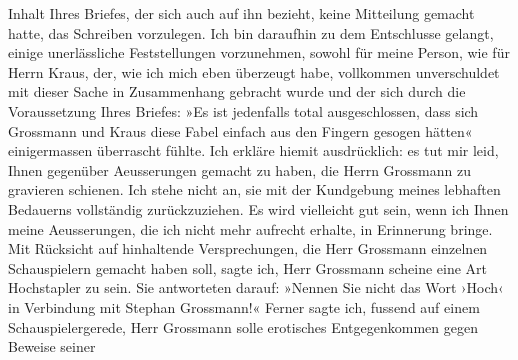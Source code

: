 \begin{ledgroupsized}[t]{13cm}
                    Inhalt Ihres Briefes, der sich auch auf ihn bezieht, keine Mitteilung gemacht
                    hatte, das Schreiben vorzulegen. Ich bin daraufhin zu dem Entschlusse gelangt,
                    einige unerlässliche Feststellungen vorzunehmen, sowohl für meine Person, wie
                    für Herrn Kraus, der, wie ich mich eben
                    überzeugt habe, vollkommen unverschuldet mit dieser Sache in Zusammenhang
                    gebracht wurde und der sich durch die Voraussetzung Ihres Briefes: »Es ist
                    jedenfalls total ausgeschlossen, dass sich Grossmann und Kraus diese Fabel
                    einfach aus den Fingern gesogen hätten« einigermassen überrascht fühlte.\pend
           \pstart
           Ich erkläre hiemit ausdrücklich: es tut mir leid, Ihnen gegenüber Aeusserungen
                    gemacht zu haben, die Herrn Grossmann zu
                    gravieren schienen. Ich stehe nicht an, sie mit der Kundgebung meines lebhaften
                    Bedauerns vollständig zurückzuziehen. Es wird vielleicht gut sein, wenn ich
                    Ihnen meine Aeusserungen, die ich nicht mehr aufrecht erhalte, in Erinnerung
                    bringe. Mit Rücksicht auf hinhaltende Versprechungen, die Herr Grossmann einzelnen {\pb}Schauspielern gemacht haben soll, sagte ich, Herr Grossmann scheine eine Art Hochstapler zu sein. Sie
                    antworteten darauf: »Nennen Sie nicht das Wort ›Hoch‹ in Verbindung mit Stephan Grossmann!« Ferner sagte ich,
                    fussend auf einem Schauspielergerede, Herr Grossmann solle erotisches Entgegenkommen gegen Beweise seiner

\end{ledgroupsized}
